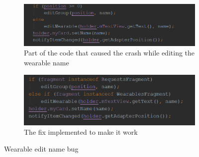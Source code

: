 \begin{figure}
\centering
\begin{subfigure}{.5\textwidth}
  \centering
   \includegraphics[scale=0.6]{resources/bugwearablwe.png}
   \caption{Part of the code that caused the crash while editing the wearable name}
  \label{fig:sub1.2}
\end{subfigure}%
\begin{subfigure}{.5\textwidth}
  \centering
   \includegraphics[scale=0.6]{resources/bugfixed.png}
   \caption{The fix implemented to make it work}
  \label{fig:sub2.2}
\end{subfigure}
\caption{Wearable edit name bug}
\label{fig:test}
\end{figure}


